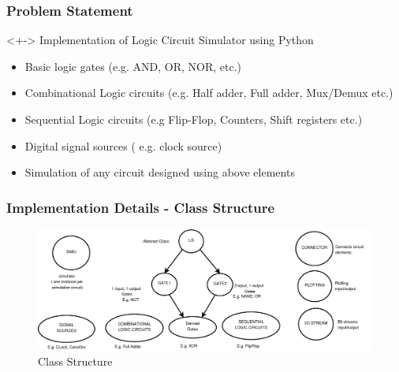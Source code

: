 \documentclass[10pt,red]{beamer}
\begin{document}
\begin{frame}
\titlepage
\end{frame}
% 

\begin{frame}
 \frametitle{Problem Statement}
  

\begin{block}<+->{}
\qquad \qquad Implementation of Logic Circuit Simulator using Python
\end{block}

\begin{itemize}
 \item Basic logic gates (e.g. AND, OR, NOR, etc.)
 \item Combinational Logic circuits (e.g. Half adder, Full adder, Mux/Demux etc.)
 \item Sequential Logic circuits (e.g Flip-Flop, Counters, Shift registers etc.)
 \item Digital signal sources ( e.g. clock source)
 \item Simulation of any circuit designed using above elements

\end{itemize}


\end{frame}


\begin{frame}
 \frametitle{Implementation Details - Class Structure}
  \begin{figure}
   \begin{center}
   \includegraphics[scale=0.25]{class3.png}
   \caption{\scriptsize{Class Structure }}
  \end{center}
  \end{figure}

\end{frame}
\end{document}
